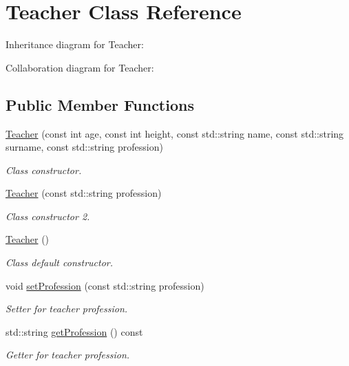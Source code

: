 \hypertarget{classTeacher}{}\section{Teacher Class Reference}
\label{classTeacher}


Inheritance diagram for Teacher\+:


Collaboration diagram for Teacher\+:
\subsection*{Public Member Functions}
\begin{DoxyCompactItemize}
\item 
\hyperlink{classTeacher_a8760a0c0903c3183f5b8a8a7439a9fe0}{Teacher} (const int age, const int height, const std\+::string name, const std\+::string surname, const std\+::string profession)
\begin{DoxyCompactList}\small\item\em Class constructor. \end{DoxyCompactList}\item 
\hyperlink{classTeacher_ad11514a739f8d862376e9d38016e5dea}{Teacher} (const std\+::string profession)
\begin{DoxyCompactList}\small\item\em Class constructor 2. \end{DoxyCompactList}\item 
\mbox{\label{classTeacher_a0d09b151c46e2abb647a2ae40cc5510c}} 
\hyperlink{classTeacher_a0d09b151c46e2abb647a2ae40cc5510c}{Teacher} ()
\begin{DoxyCompactList}\small\item\em Class default constructor. \end{DoxyCompactList}\item 
void \hyperlink{classTeacher_a55771d4d6385f4dabf8fc7a8773c9a13}{set\+Profession} (const std\+::string profession)
\begin{DoxyCompactList}\small\item\em Setter for teacher profession. \end{DoxyCompactList}\item 
\mbox{\label{classTeacher_a980e640fad9bd54894326ffb2a5779ca}} 
std\+::string \hyperlink{classTeacher_a980e640fad9bd54894326ffb2a5779ca}{get\+Profession} () const
\begin{DoxyCompactList}\small\item\em Getter for teacher profession. \end{DoxyCompactList}\item 

\end{DoxyCompactItemize}
